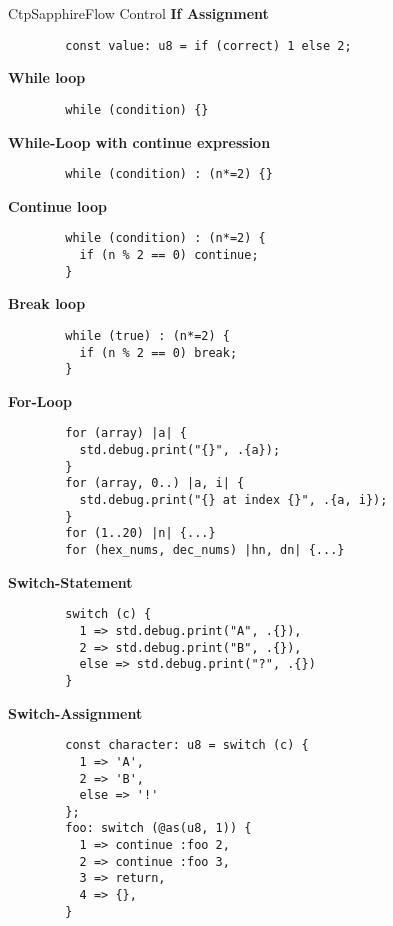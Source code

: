 \documentclass[10pt,a4paper]{article}
\begin{document}
\begin{multicols*}{3}
\begin{mycolorbox}{CtpSapphire}{Flow Control}
		\textbf{If Assignment}
	\begin{verbatim}
		const value: u8 = if (correct) 1 else 2;
	\end{verbatim}

		\textbf{While loop}
	\begin{verbatim}
		while (condition) {}
	\end{verbatim}

		\textbf{While-Loop with continue expression}
	\begin{verbatim}
		while (condition) : (n*=2) {}
	\end{verbatim}

		\textbf{Continue loop}
	\begin{verbatim}
		while (condition) : (n*=2) {
		  if (n % 2 == 0) continue;
		}
	\end{verbatim}
		\textbf{Break loop }
	\begin{verbatim}
		while (true) : (n*=2) {
		  if (n % 2 == 0) break;
		}
	\end{verbatim}

		\textbf{For-Loop}
	\begin{verbatim}
		for (array) |a| {
		  std.debug.print("{}", .{a});
		}
		for (array, 0..) |a, i| {
		  std.debug.print("{} at index {}", .{a, i});
		}
		for (1..20) |n| {...}
		for (hex_nums, dec_nums) |hn, dn| {...}
	\end{verbatim}

		\textbf{Switch-Statement}
	\begin{verbatim}
		switch (c) {
		  1 => std.debug.print("A", .{}),
		  2 => std.debug.print("B", .{}),
		  else => std.debug.print("?", .{})
		}
	\end{verbatim}

		\textbf{Switch-Assignment}
	\begin{verbatim}
		const character: u8 = switch (c) {
		  1 => 'A',
		  2 => 'B',
		  else => '!'
		};
		foo: switch (@as(u8, 1)) {
		  1 => continue :foo 2,
		  2 => continue :foo 3,
		  3 => return,
		  4 => {},
		}
	\end{verbatim}


\end{mycolorbox}
\end{multicols*}
\end{document}
